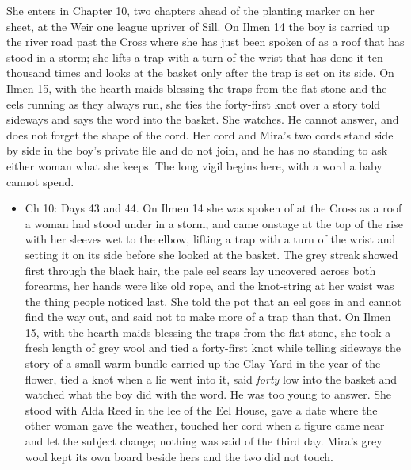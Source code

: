 \documentclass{design/chronicle}
\begin{document}
{
She enters in Chapter 10, two chapters ahead of the planting marker on her sheet, at the Weir one league upriver of Sill. On Ilmen 14 the boy is carried up the river road past the Cross where she has just been spoken of as a roof that has stood in a storm; she lifts a trap with a turn of the wrist that has done it ten thousand times and looks at the basket only after the trap is set on its side. On Ilmen 15, with the hearth-maids blessing the traps from the flat stone and the eels running as they always run, she ties the forty-first knot over a story told sideways and says the word into the basket. She watches. He cannot answer, and does not forget the shape of the cord. Her cord and Mira’s two cords stand side by side in the boy’s private file and do not join, and he has no standing to ask either woman what she keeps. The long vigil begins here, with a word a baby cannot spend.

\begin{itemize}[leftmargin=1.4em,itemsep=1pt,topsep=3pt,parsep=0pt]

\item Ch 10: Days 43 and 44. On Ilmen 14 she was spoken of at the Cross as a roof a woman had stood under in a storm, and came onstage at the top of the rise with her sleeves wet to the elbow, lifting a trap with a turn of the wrist and setting it on its side before she looked at the basket. The grey streak showed first through the black hair, the pale eel scars lay uncovered across both forearms, her hands were like old rope, and the knot-string at her waist was the thing people noticed last. She told the pot that an eel goes in and cannot find the way out, and said not to make more of a trap than that. On Ilmen 15, with the hearth-maids blessing the traps from the flat stone, she took a fresh length of grey wool and tied a forty-first knot while telling sideways the story of a small warm bundle carried up the Clay Yard in the year of the flower, tied a knot when a lie went into it, said \emph{forty} low into the basket and watched what the boy did with the word. He was too young to answer. She stood with Alda Reed in the lee of the Eel House, gave a date where the other woman gave the weather, touched her cord when a figure came near and let the subject change; nothing was said of the third day. Mira’s grey wool kept its own board beside hers and the two did not touch.

\end{itemize}
}
\end{document}
